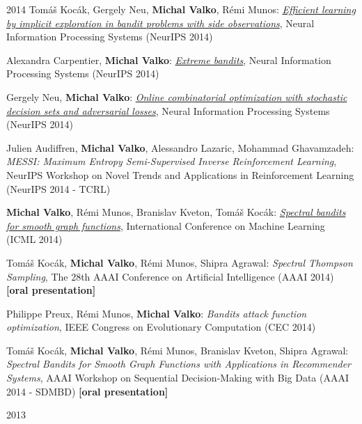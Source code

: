 \documentclass{resume}
\begin{document}
\begin{category}{2014}
\citembullet
Tom\'a\v s Koc\' ak, Gergely Neu, {\bf Michal Valko}, R\' emi Munos:  
\href{http://researchers.lille.inria.fr/~valko/hp/serve.php?what=publications/kocak2014efficient.pdf}
{\emph{Efficient learning by implicit exploration in bandit problems with side observations}}, 
Neural Information Processing Systems ({\sf NeurIPS 2014})

\citembullet
Alexandra Carpentier, {\bf Michal Valko}: 
\href{http://researchers.lille.inria.fr/~valko/hp/serve.php?what=publications/carpentier2014extreme.pdf}
{\emph{Extreme bandits}},
Neural Information Processing Systems ({\sf NeurIPS 2014})

\citembullet
Gergely Neu, {\bf Michal Valko}: 
\href{http://researchers.lille.inria.fr/~valko/hp/serve.php?what=publications/calandriello2018improved.pdf}
{\emph{Online combinatorial optimization with stochastic decision sets and adversarial losses}}, 
Neural Information 
Processing Systems ({\sf NeurIPS 2014})

\citembullet
Julien Audiffren, {\bf Michal Valko},  Alessandro Lazaric, Mohammad Ghavamzadeh:
\emph{MESSI: Maximum Entropy Semi-Supervised Inverse Reinforcement Learning},
 NeurIPS Workshop on Novel Trends and Applications in Reinforcement Learning
({\sf NeurIPS 2014 - TCRL}) 


\citembullet
{\bf Michal Valko}, R\' emi Munos, Branislav Kveton, Tom\'a\v s Koc\' ak:
\href{http://researchers.lille.inria.fr/~valko/hp/serve.php?what=publications/valko2014spectral.pdf}
{\emph{Spectral bandits for smooth graph functions}},
International Conference on Machine Learning
({\sf ICML 2014}) 

\citembullet
Tom\'a\v s Koc\' ak, {\bf Michal Valko},  R\' emi Munos, Shipra Agrawal:
\emph{Spectral Thompson Sampling},
 The 28th AAAI Conference on Artificial Intelligence 
({\sf AAAI 2014}) {\bf [oral presentation]}

\citembullet
Philippe Preux, R\' emi Munos, {\bf Michal Valko}:
\emph{Bandits attack function optimization},
IEEE Congress on Evolutionary Computation
({\sf CEC 2014}) 


\citembullet
Tom\'a\v s Koc\' ak, {\bf Michal Valko},  R\' emi Munos, Branislav Kveton, 
Shipra Agrawal:
\emph{Spectral Bandits for Smooth Graph Functions with Applications in 
Recommender Systems},
 AAAI Workshop on Sequential Decision-Making with Big Data 
({\sf AAAI 2014 - SDMBD}) {\bf [oral presentation]}



\end{category}\begin{category}{2013}


\end{category}
\end{document}
